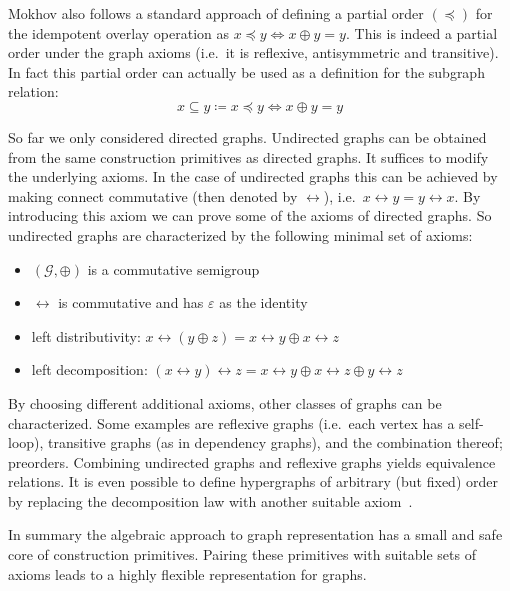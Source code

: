 \documentclass{article}
\renewcommand{\epsilon}{\varepsilon}
\newcommand{\eps}{\epsilon}
\newcommand{\overlay}{\oplus}
\begin{document}
Mokhov also follows a standard approach of defining a partial order $(\preceq)$ for the
idempotent overlay operation as $x \preceq y \iff x \overlay y = y$. This is indeed
a partial order under the graph axioms (i.e.\ it is reflexive, antisymmetric and
transitive). In fact this partial order can actually be used as a definition for
the subgraph relation:
\[
  x \subseteq y \coloneqq x \preceq y \iff x \overlay y = y
\]

So far we only considered directed graphs. Undirected graphs can be
obtained from the same construction primitives as directed graphs. It suffices
to modify the underlying axioms. In the case of undirected graphs this can be
achieved by making connect commutative (then denoted by $\leftrightarrow$),
i.e.\ $x \leftrightarrow y = y \leftrightarrow x$. By introducing this axiom we
can prove some of the axioms of directed graphs. So undirected graphs are
characterized by the following minimal set of axioms:
\begin{itemize}
\item $(\mathcal{G}, \oplus)$ is a commutative semigroup
\item $\leftrightarrow$ is commutative and has $\eps$ as the identity
\item left distributivity: $x \leftrightarrow (y \oplus z) = x \leftrightarrow
  y \oplus x \leftrightarrow z$
\item left decomposition: $(x \leftrightarrow y) \leftrightarrow z = x
  \leftrightarrow y \oplus x \leftrightarrow z \oplus y \leftrightarrow z$
\end{itemize}
By choosing different additional axioms, other classes of graphs can be
characterized. Some examples are reflexive graphs (i.e.\ each vertex has a
self-loop), transitive graphs (as in dependency graphs), and the combination
thereof; preorders. Combining undirected graphs and reflexive graphs yields
equivalence relations. It is even possible to define hypergraphs of arbitrary
(but fixed) order by replacing the decomposition law with another suitable
axiom~\cite{mokhov2017algebraic}.

In summary the algebraic approach to graph representation has a small and safe
core of construction primitives. Pairing these primitives with suitable sets of
axioms leads to a highly flexible representation for graphs.
\end{document}
